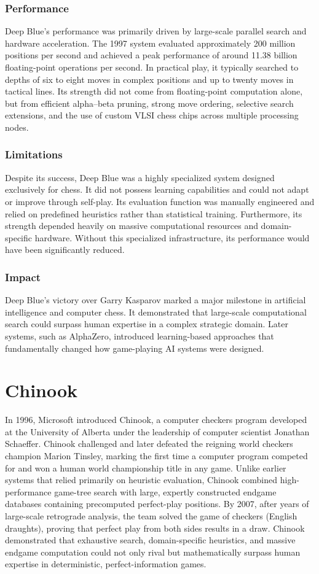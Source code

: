 \documentclass[11pt,a4paper]{report}
\begin{document}
\subsubsection{Performance}
Deep Blue’s performance was primarily driven by large-scale parallel search and hardware acceleration. The 1997 system evaluated approximately
200 million positions per second and achieved a peak performance of around 11.38 billion floating-point operations per second. In practical play,
it typically searched to depths of six to eight moves in complex positions and up to twenty moves in tactical lines. Its strength did not come from
floating-point computation alone, but from efficient alpha–beta pruning, strong move ordering, selective search extensions, and the use of custom
VLSI chess chips across multiple processing nodes.

\subsubsection{Limitations}
Despite its success, Deep Blue was a highly specialized system designed exclusively for chess. It did not possess learning capabilities and could
not adapt or improve through self-play. Its evaluation function was manually engineered and relied on predefined heuristics rather than statistical
training. Furthermore, its strength depended heavily on massive computational resources and domain-specific hardware. Without this specialized
infrastructure, its performance would have been significantly reduced.

\subsubsection{Impact}
Deep Blue’s victory over Garry Kasparov marked a major milestone in artificial intelligence and computer chess. It demonstrated that large-scale
computational search could surpass human expertise in a complex strategic domain. Later systems, such as AlphaZero, introduced learning-based approaches
that fundamentally changed how game-playing AI systems were designed.

\section{Chinook}
In 1996, Microsoft introduced Chinook, a computer checkers program developed at the University of Alberta under the leadership of computer scientist
Jonathan Schaeffer. Chinook challenged and later defeated the reigning world checkers champion Marion Tinsley, marking the first time a computer
program competed for and won a human world championship title in any game. Unlike earlier systems that relied primarily on heuristic evaluation, Chinook
combined high-performance game-tree search with large, expertly constructed endgame databases containing precomputed perfect-play positions. By 2007,
after years of large-scale retrograde analysis, the team solved the game of checkers (English draughts), proving that perfect play from both sides
results in a draw. Chinook demonstrated that exhaustive search, domain-specific heuristics, and massive endgame computation could not only rival but
mathematically surpass human expertise in deterministic, perfect-information games.
\end{document}
